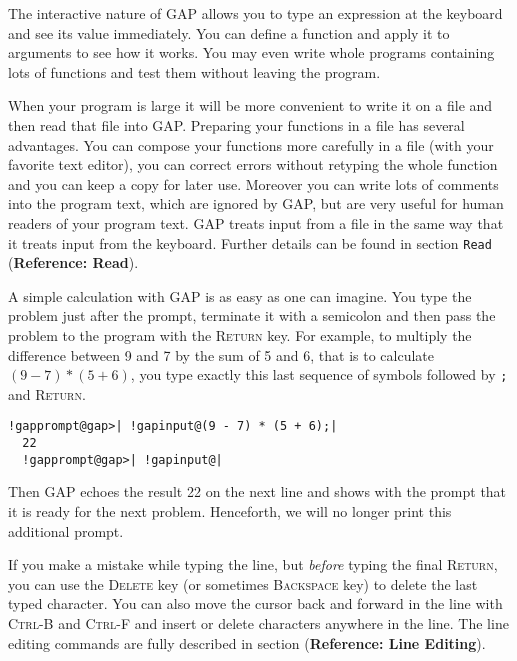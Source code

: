 \documentclass[a4paper,11pt]{report}
\begin{document}
{{ The interactive nature of \textsf{GAP} allows you to type an expression at the keyboard and see its value
immediately. You can define a function and apply it to arguments to see how it
works. You may even write whole programs containing lots of functions and test
them without leaving the program. 

 When your program is large it will be more convenient to write it on a file
and then read that file into \textsf{GAP}. Preparing your functions in a file has several advantages. You can compose
your functions more carefully in a file (with your favorite text editor), you
can correct errors without retyping the whole function and you can keep a copy
for later use. Moreover you can write lots of comments into the program text,
which are ignored by \textsf{GAP}, but are very useful for human readers of your program text. \textsf{GAP} treats input from a file in the same way that it treats input from the
keyboard. Further details can be found in section \texttt{Read} (\textbf{Reference: Read}). 

 A simple calculation with \textsf{GAP} is as easy as one can imagine. You type the problem just after the prompt,
terminate it with a semicolon and then pass the problem to the program with
the \textsc{Return} key. For example, to multiply the difference between 9 and 7 by the sum of 5
and 6, that is to calculate $(9 - 7) * (5 + 6)$, you type exactly this last sequence of symbols followed by \texttt{;} and \textsc{Return}. 

 
\begin{Verbatim}[commandchars=!@|,fontsize=\small,frame=single,label=Example]
  !gapprompt@gap>| !gapinput@(9 - 7) * (5 + 6);|
  22
  !gapprompt@gap>| !gapinput@|
\end{Verbatim}
 

 Then \textsf{GAP} echoes the result 22 on the next line and shows with the prompt that it is
ready for the next problem. Henceforth, we will no longer print this
additional prompt. 

  If you make a mistake while typing the line, but \emph{before} typing the final \textsc{Return}, you can use the \textsc{Delete} key (or sometimes \textsc{Backspace} key) to delete the last typed character. You can also move the cursor back and
forward in the line with \textsc{Ctrl-B} and \textsc{Ctrl-F} and insert or delete characters anywhere in the line. The line editing
commands are fully described in section{\nobreakspace} (\textbf{Reference: Line Editing}). 

}}
\end{document}

